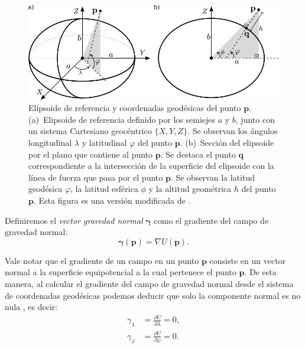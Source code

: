 \begin{figure}
    \centering
    \includegraphics[width=\linewidth]{figs/cartesian-geodetic-systems.pdf}
    \caption{
        Elipsoide de referencia y coordenadas geodésicas del punto
        $\mathbf{p}$.
        (a)~Elipsoide de referencia definido por los
        semiejes $a$ y $b$, junto con un sistema
        Cartesiano geocéntrico $\{X, Y, Z\}$. Se observan los ángulos
        longitudinal $\lambda$ y latitudinal $\varphi$ del punto
        $\mathbf{p}$.
        (b)~Sección del elipsoide por el plano que contiene al punto
        $\mathbf{p}$. Se destaca el punto $\mathbf{q}$ correspondiente
        a la intersección de la superficie del elipsoide con la línea de
        fuerza que pasa por el punto $\mathbf{p}$.
        Se observan la latitud geodésica $\varphi$, la latitud esférica
        $\phi$ y la altitud geométrica $h$ del punto $\mathbf{p}$.
        Esta figura es una versión modificada de \citet{oliveira2021}.
    }
    \label{fig:coordenadas-geodesicas}
\end{figure}

Definiremos el \emph{vector gravedad normal} $\boldsymbol\gamma$ como el
gradiente del campo de gravedad normal:
%
\begin{equation}
    \boldsymbol\gamma(\mathbf{p}) = \nabla U(\mathbf{p}).
\end{equation}

Vale notar que el gradiente de un campo en un punto $\mathbf{p}$ consiste en un
vector normal a la superficie equipotencial a la cual pertenece el punto
$\mathbf{p}$.
De esta manera, al calcular el gradiente del campo de gravedad normal desde el
sistema de coordenadas geodésicas podemos deducir que solo la componente
normal es no nula \citep[][p.~68]{heiskanen1967}, es decir:
%
\begin{align}
    \gamma_\lambda &=
        \frac{\partial U}{\partial \lambda} = 0,  \\
    \gamma_\varphi &=
        \frac{\partial U}{\partial \varphi} = 0.
\end{align}

